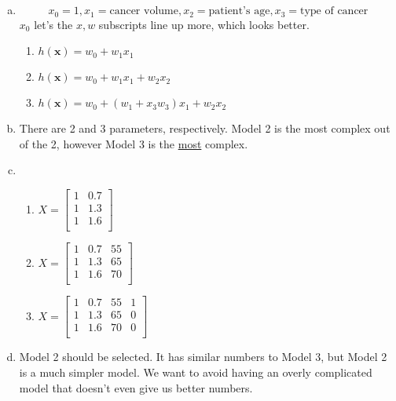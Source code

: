 \documentclass[12pt]{article}
\begin{document}
\section{}
\begin{enumerate}[(a)]
	\item \[ x_0 = 1, x_1 = \text{cancer volume}, x_2 = \text{patient's age}, x_3 = \text{type of cancer} \]
	$ x_0 $ let's the $ x, w $ subscripts line up more, which looks better.
	\begin{enumerate} [(Model 1)]
		\item $ h(\textbf{x}) = w_0 + w_1x_1 $
		
		\item $ h(\textbf{x}) = w_0 + w_1x_1 + w_2x_2$
		
		\item $ h(\textbf{x}) = w_0 + (w_1 + x_3w_3)x_1 + w_2x_2$
	\end{enumerate}

	\item There are 2 and 3 parameters, respectively. Model 2 is the most complex out of the 2, however Model 3 is the \underline{most} complex.
	
	\item 
	\begin{enumerate} [(Model 1)]
		\item 
		$X = \begin{bmatrix}
			1 & 0.7 \\
			1 & 1.3 \\
			1 & 1.6 \\
		\end{bmatrix}$
		
		\item 
		$X = \begin{bmatrix}
			1 & 0.7 & 55 \\
			1 & 1.3 & 65 \\
			1 & 1.6 & 70 \\
		\end{bmatrix}$
		
		\item 
		$X = \begin{bmatrix}
			1 & 0.7 & 55 & 1 \\
			1 & 1.3 & 65 & 0 \\
			1 & 1.6 & 70 & 0 \\
		\end{bmatrix}$
	\end{enumerate}

	\item Model 2 should be selected. It has similar numbers to Model 3, but Model 2 is a much simpler model. We want to avoid having an overly complicated model that doesn't even give us better numbers.
\end{enumerate}
\newpage
\end{document}
